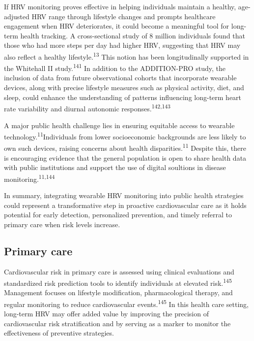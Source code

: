 \documentclass[
  a4paper,
  headsepline=true,
  open=left]{scrbook}
\begin{document}
If HRV monitoring proves effective in helping individuals maintain a
healthy, age-adjusted HRV range through lifestyle changes and prompts
healthcare engagement when HRV deteriorates, it could become a
meaningful tool for long-term health tracking. A cross-sectional study
of 8 million individuals found that those who had more steps per day had
higher HRV, suggesting that HRV may also reflect a healthy
lifestyle.\textsuperscript{13} This notion has been longitudinally
supported in the Whitehall II study.\textsuperscript{141} In addition to
the ADDITION-PRO study, the inclusion of data from future observational
cohorts that incorporate wearable devices, along with precise lifestyle
measures such as physical activity, diet, and sleep, could enhance the
understanding of patterns influencing long-term heart rate variability
and diurnal autonomic responses.\textsuperscript{142,143}

A major public health challenge lies in ensuring equitable access to
wearable technology.\textsuperscript{11}Individuals from lower
socioeconomic backgrounds are less likely to own such devices, raising
concerns about health disparities.\textsuperscript{11} Despite this,
there is encouraging evidence that the general population is open to
share health data with public institutions and support the use of
digital soultions in disease monitoring.\textsuperscript{11,144}

In summary, integrating wearable HRV monitoring into public health
strategies could represent a transformative step in proactive
cardiovascular care as it holds potential for early detection,
personalized prevention, and timely referral to primary care when risk
levels increase.

\hypertarget{primary-care}{%
\subsection{Primary care}\label{primary-care}}

Cardiovascular risk in primary care is assessed using clinical
evaluations and standardized risk prediction tools to identify
individuals at elevated risk.\textsuperscript{145} Management focuses on
lifestyle modification, pharmacological therapy, and regular monitoring
to reduce cardiovascular events.\textsuperscript{145} In this health
care setting, long-term HRV may offer added value by improving the
precision of cardiovascular risk stratification and by serving as a
marker to monitor the effectiveness of preventive strategies.
\end{document}
